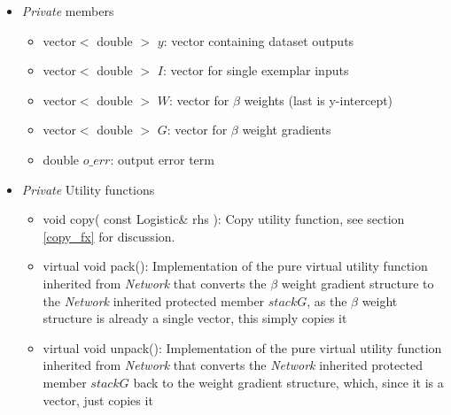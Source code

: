 \documentclass{report}
\begin{document}
\begin{itemize}
\begin{itemize}
      method inherited from {\em Iterative} which trains one iteration
      through the training set, and returns set error
\item virtual double innerTrainSet(): Implementation of the pure
      virtual method inherited from {\em Network} which is called by
      trainSet() to calculate the gradient and return set error, used
      for automatic stepsize selection
\item virtual void forward( Matrix$<$ double $>$\& $M$, unsigned $n$):
      Implementation of the pure virtual method inherited from {\em
      Network} which applies the sigmoidal function for one input row
      $n$ in a Matrix of inputs $M$ (e.g. either the inherited {\em
      Model} Matrix $Train$ or $Test$)
\item virtual void removeInputs( vector$<$ unsigned $>$\&
      $v$ ): Implementation of the pure virtual method which takes as
      its argument a vector of unsigned $v$ representing positions of
      input nodes, and removes those nodes from the {\em Logistic}
      object
\end{itemize}

\item {\em Private} members

\begin{itemize}
\item vector$<$ double $>$ $y$: vector containing dataset outputs
\item vector$<$ double $>$ $I$: vector for single exemplar inputs
\item vector$<$ double $>$ $W$: vector for $\beta$ weights (last is
      y-intercept)
\item vector$<$ double $>$ $G$: vector for $\beta$ weight gradients
\item double $o\_err$: output error term
\end{itemize}

\item {\em Private} Utility functions

\begin{itemize}
\item void copy( const Logistic\& rhs ): Copy utility function, see
      section \ref{copy_fx} for discussion.
\item virtual void pack(): Implementation of the pure virtual utility
      function inherited from {\em Network} that converts the $\beta$
      weight gradient structure to the {\em Network} inherited
      protected member $stackG$, as the $\beta$ weight structure is
      already
      a single vector, this simply copies it
\item virtual void unpack(): Implementation of the pure virtual
      utility function inherited from {\em Network} that converts the
      {\em Network} inherited protected member $stackG$ back to the
      weight gradient structure, which, since it is a vector, just
      copies
      it
\end{itemize}

\end{itemize}
\end{document}
